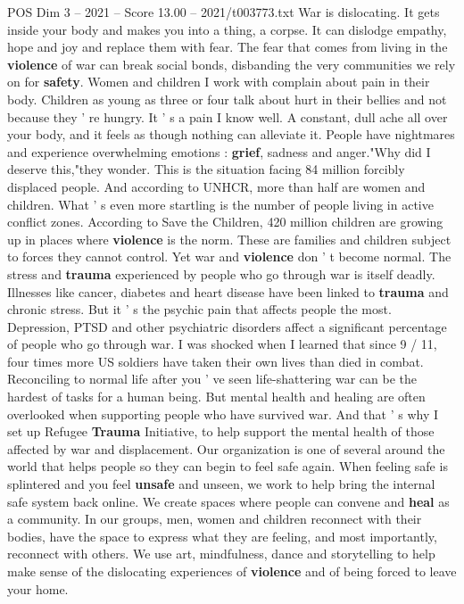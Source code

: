 \begin{textsample}{POS Dim 3 – 2021 – Score 13.00 – 2021/t003773.txt}
War is dislocating.
It gets inside your body and makes you into a thing, a corpse.
It can dislodge empathy, hope and joy and replace them with fear.
The fear that comes from living in the \textbf{violence} of war can break social bonds, disbanding the very communities we rely on for \textbf{safety}.
Women and children I work with complain about pain in their body.
Children as young as three or four talk about hurt in their bellies and not because they ' re hungry.
It ' s a pain I know well.
A constant, dull ache all over your body, and it feels as though nothing can alleviate it.
People have nightmares and experience overwhelming emotions : \textbf{grief}, sadness and anger."Why did I deserve this,"they wonder.
This is the situation facing 84 million forcibly displaced people.
And according to UNHCR, more than half are women and children.
What ' s even more startling is the number of people living in active conflict zones.
According to Save the Children, 420 million children are growing up in places where \textbf{violence} is the norm.
These are families and children subject to forces they cannot control.
Yet war and \textbf{violence} don ' t become normal.
The stress and \textbf{trauma} experienced by people who go through war is itself deadly.
Illnesses like cancer, diabetes and heart disease have been linked to \textbf{trauma} and chronic stress.
But it ' s the psychic pain that affects people the most.
Depression, PTSD and other psychiatric disorders affect a significant percentage of people who go through war.
I was shocked when I learned that since 9 / 11, four times more US soldiers have taken their own lives than died in combat.
Reconciling to normal life after you ' ve seen life-shattering war can be the hardest of tasks for a human being.
But mental health and healing are often overlooked when supporting people who have survived war.
And that ' s why I set up Refugee \textbf{Trauma} Initiative, to help support the mental health of those affected by war and displacement.
Our organization is one of several around the world that helps people so they can begin to feel safe again.
When feeling safe is splintered and you feel \textbf{unsafe} and unseen, we work to help bring the internal safe system back online.
We create spaces where people can convene and \textbf{heal} as a community.
In our groups, men, women and children reconnect with their bodies, have the space to express what they are feeling, and most importantly, reconnect with others.
We use art, mindfulness, dance and storytelling to help make sense of the dislocating experiences of \textbf{violence} and of being forced to leave your home.

\end{textsample}
